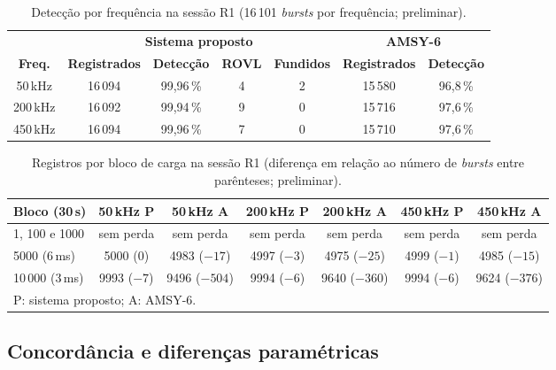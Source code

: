 \begin{table}[htbp]
	\centering
	\footnotesize
		\caption{Detecção por frequência na sessão R1 (16\,101 \textit{bursts} por frequência; preliminar).}
	\label{v2:tab:deteccao_r1}
	\begin{tabular}{|c|c|c|c|c|c|c|}
		\hline
		 & \multicolumn{4}{c|}{\textbf{Sistema proposto}} & \multicolumn{2}{c|}{\textbf{AMSY-6}} \\
		\cline{2-7}
		\textbf{Freq.} & \textbf{Registrados} & \textbf{Detecção} & \textbf{ROVL} & \textbf{Fundidos} & \textbf{Registrados} & \textbf{Detecção} \\
		\hline
		50\,kHz & 16\,094 & 99,96\,\% & 4 & 2 & 15\,580 & 96,8\,\% \\
		\hline
		200\,kHz & 16\,092 & 99,94\,\% & 9 & 0 & 15\,716 & 97,6\,\% \\
		\hline
		450\,kHz & 16\,094 & 99,96\,\% & 7 & 0 & 15\,710 & 97,6\,\% \\
		\hline
	\end{tabular}
\end{table}

\begin{table}[htbp]
	\centering
	\footnotesize
		\caption{Registros por bloco de carga na sessão R1 (diferença em relação ao número de \textit{bursts} entre parênteses; preliminar).}
	\label{v2:tab:carga_r1}
	\setlength{\tabcolsep}{3pt}
	\begin{tabular}{|p{}|c|c|c|c|c|c|}
		\hline
		\textbf{Bloco (30\,s)} & \textbf{50\,kHz P} & \textbf{50\,kHz A} & \textbf{200\,kHz P} & \textbf{200\,kHz A} & \textbf{450\,kHz P} & \textbf{450\,kHz A} \\
		\hline
		1, 100 e 1000 & sem perda & sem perda & sem perda & sem perda & sem perda & sem perda \\
		\hline
		5000 (6\,ms) & 5000 (0) & 4983 (\(-17\)) & 4997 (\(-3\)) & 4975 (\(-25\)) & 4999 (\(-1\)) & 4985 (\(-15\)) \\
		\hline
		10\,000 (3\,ms) & 9993 (\(-7\)) & 9496 (\(-504\)) & 9994 (\(-6\)) & 9640 (\(-360\)) & 9994 (\(-6\)) & 9624 (\(-376\)) \\
		\hline
		\multicolumn{7}{|l|}{P: sistema proposto; A: AMSY-6.} \\
		\hline
	\end{tabular}
\end{table}


\subsection{Concordância e diferenças paramétricas}
\label{v2:subsec:concordancia_parametrica_resultados}

